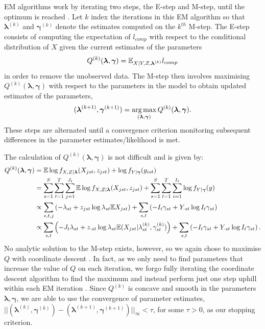\documentclass[smallextended]{svjour3}
\begin{document}
EM algorithms work by iterating two steps, the E-step and M-step, until the optimum is reached \citep{Dempster:1977,McLachlan:2007}.  Let $k$ index the iterations in this EM algorithm so that $\boldsymbol \lambda^{(k)}$ and $\boldsymbol \gamma^{(k)}$ denote the estimates computed on the $k^{th}$ M-step. The E-step consists of computing the expectation of $l_{comp}$ with respect to the conditional distribution of $X$ given the current estimates of the parameters
\[
Q^{(k)}(\boldsymbol{\lambda},\boldsymbol{\gamma}) = \mathbb{E}_{X|Y,Z,\boldsymbol{\lambda}^{(k)}} l_{comp}
\]
in order to remove the unobserved data. The M-step then involves maximising $Q^{(k)}(\boldsymbol{\lambda},\boldsymbol{\gamma})$ with respect to the parameters in the model to obtain updated estimates of the parameters,
\[
(\boldsymbol{\lambda}^{(k+1)}, \boldsymbol{\gamma}^{(k+1)}) = \operatorname*{arg\,max}_{(\boldsymbol{\lambda}, \boldsymbol{\gamma})} Q^{(k)}(\boldsymbol{\lambda}, \boldsymbol{\gamma}).
\]
These steps are alternated until a convergence criterion monitoring subsequent differences in the parameter estimates/likelihood is met.  

The calculation of $Q^{(k)}(\boldsymbol{\lambda}, \boldsymbol{\gamma})$ is not difficult and is given by:
\begin{align}
  \label{eq:estep}
  \begin{split}
  Q^{(k)}(\boldsymbol{\lambda}, \boldsymbol{\gamma})
  & = \mathbb{E} \log{f_{X,Z|\boldsymbol{\lambda}}(X_{jst},z_{jst})} + \log{f_{Y|\boldsymbol{\gamma}}(y_{ist})} \\
  & = \sum_{s=1}^S \sum_{t=1}^T \sum_{j=1}^{J_t} \mathbb{E} \log{f_{X,Z|\boldsymbol{\lambda}}(X_{jst},z_{jst})}
  + \sum_{s=1}^S \sum_{t=1}^T \sum_{i=1}^{I_t} \log{f_{Y|\boldsymbol{\gamma}}(y)} \\
  & \propto \sum_{s,t,j} \left( - \lambda_{st} 
    + z_{jst} \log{\lambda_{st}} \mathbb{E} X_{jst} \right) + \sum_{s,t} \left( -I_t \gamma_{st} + Y_{\cdot st} \log{I_t \gamma_{st}} \right) \\
  & \propto \sum_{s,t} \left( -J_t \lambda_{st} + z_{\cdot st} \log{\lambda_{st}} \mathbb{E} (X_{jst}|\lambda_{st}^{(k)},\gamma_{st}^{(k)}) \right) + \sum_{s,t} \left( -I_t \gamma_{st} + Y_{\cdot st} \log{I_t \gamma_{st}} \right).
\end{split}
\end{align}
\noindent No analytic solution to the M-step exists, however, so we again chose to maximise $Q$ with coordinate descent \citep{Luo:1992}.  In fact, as we only need to find parameters that increase the value of $Q$ on each iteration, we forgo fully iterating the coordinate descent algorithm to find the maximum and instead perform just one step uphill within each EM iteration \citep{Givens:2012}.  Since $Q^{(k)}$ is concave and smooth in the parameters $\boldsymbol{\lambda}, \boldsymbol{\gamma}$, we are able to use the convergence of parameter estimates, $||(\boldsymbol{\lambda}^{(k)}, \boldsymbol{\gamma}^{(k)}) - (\boldsymbol{\lambda}^{(k+1)}, \boldsymbol{\gamma}^{(k+1)})||_{\infty} < \tau $, for some $\tau>0$, as our stopping criterion.
\end{document}

